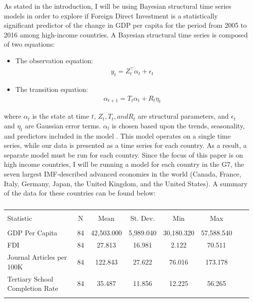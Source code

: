 \documentclass{article}
\begin{document}
As stated in the introduction, I will be using Bayesian structural time series models in order to explore if Foreign Direct Investment is a statistically significant predictor of the change in GDP per capita for the period from 2005 to 2016 among high-income countries. A Bayesian structural time series is composed of two equations:
\begin{itemize}
	\item The observation equation:
	\begin{align*}
		y_t = Z_t^\intercal \alpha_t + \epsilon_t
	\end{align*}
	\item The transition equation:
	\begin{align*}
		\alpha_{t+1} = T_t \alpha_t + R_t\eta_t
	\end{align*}
\end{itemize}
where $\alpha_t$ is the state at time $t$, $Z_t, T_t, and R_t$ are structural parameters, and $\epsilon_t$ and $\eta_t$ are Gaussian error terms. $\alpha_t$ is chosen based upon the trends, seasonality, and predictors included in the model \cite{scott}. This model operates on a single time series, while our data is presented as a time series for each country. As a result, a separate model must be run for each country. Since the focus of this paper is on high income countries, I will be running a model for each country in the G7, the seven largest IMF-described advanced economies in the world (Canada, France, Italy, Germany, Japan, the United Kingdom, and the United States). A summary of the data for these countries can be found below:
\begin{table}[!htbp] \centering 
  \caption{} 
  \label{} 
\begin{tabular}{@{\extracolsep{5pt}}lccccccc} 
\\[-1.8ex]\hline 
\hline \\[-1.8ex] 
Statistic & \multicolumn{1}{c}{N} & \multicolumn{1}{c}{Mean} & \multicolumn{1}{c}{St. Dev.} & \multicolumn{1}{c}{Min} & \multicolumn{1}{c}{Max} \\ 
\hline \\[-1.8ex] 
GDP Per Capita & 84 & 42,503.000 & 5,989.040 & 30,180.320 & 57,588.540 \\ 
FDI & 84 & 27.813 & 16.981 & 2.122 & 70.511 \\ 
Journal Articles per 100K & 84 & 122.843 & 27.622 & 76.016 & 173.178 \\ 
Tertiary School Completion Rate & 84 & 35.487 & 11.856 & 12.225 & 56.265 \\ 
\hline \\[-1.8ex] 
\end{tabular} 
\end{table} 
\end{document}
